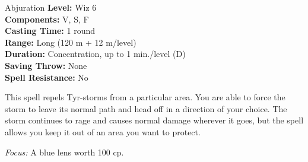 {Abjuration}
{
	\textbf{Level:}
	Wiz 6\\
	\textbf{Components:}
	V, S, F\\
	\textbf{Casting Time:}
	1 round\\
	\textbf{Range:}
	Long (120 m + 12 m/level)\\
	\textbf{Duration:}
	Concentration, up to 1 min./level (D)\\
	\textbf{Saving Throw:}
	None\\
	\textbf{Spell Resistance:}
	No\\
}
{
	This spell repels Tyr-storms from a particular area. You are able to force the storm to leave its normal path and head off in a direction of your choice. The storm continues to rage and causes normal damage wherever it goes, but the spell allows you keep it out of an area you want to protect.

	\textit{Focus:} A blue lens worth 100 cp.
}
